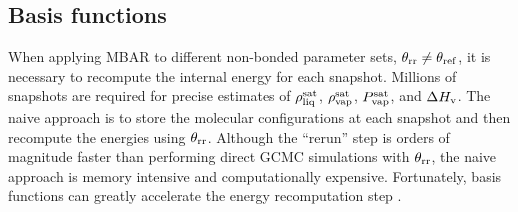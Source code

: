 \documentclass[journal=jced,manuscript=article]{achemso}
\begin{document}

\subsection{Basis functions} \label{sec: Basis functions}

When applying MBAR to different non-bonded parameter sets, $\theta_{\rm rr} \neq \theta_{\rm ref}$, it is necessary to recompute the internal energy for each snapshot. Millions of snapshots are required for precise estimates of $\rho_{\rm liq}^{\rm sat}$, $\rho_{\rm vap}^{\rm sat}$, $P_{\rm vap}^{\rm sat}$, and $\Delta H_{\rm v}$. The naive approach is to store the molecular configurations at each snapshot and then recompute the energies using $\theta_{\rm rr}$. Although the ``rerun'' step is orders of magnitude faster than performing direct GCMC simulations with $\theta_{\rm rr}$, the naive approach is memory intensive and computationally expensive. Fortunately, basis functions can greatly accelerate the energy recomputation step  \cite{naden:jctc:2016,Postdoc_1}. 
\end{document}
